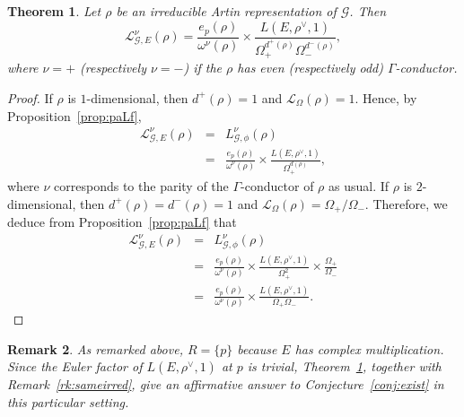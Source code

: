\documentclass{amsart}
\newtheorem{theorem}{Theorem}[section]
\newtheorem{remark}[theorem]{Remark}
\begin{document}
\begin{theorem}\label{thm:exist}
Let $\rho$ be an irreducible Artin representation of ${\mathcal{G}}$. Then
\[
{\mathcal{L}}_{{\mathcal{G}},E}^\nu(\rho)=\frac{e_p(\rho)}{\omega^\nu(\rho)}\times\frac{L(E,\rho^\vee,1)}{\Omega_+^{d^+(\rho)}\Omega_-^{d^-(\rho)}},
\]
where $\nu=+$ (respectively $\nu=-$) if the $\rho$ has even (respectively odd) $\Gamma$-conductor.
\end{theorem}
\begin{proof}
If $\rho$ is $1$-dimensional, then $d^+(\rho)=1$ and ${\mathcal{L}}_\Omega(\rho)=1$. Hence, by Proposition~\ref{prop:paLf},
\begin{eqnarray*}
{\mathcal{L}}_{{\mathcal{G}},E}^\nu(\rho)&=&L_{{\mathcal{G}},\phi}^\nu(\rho)\\
&=&\frac{e_p(\rho)}{\omega^\nu(\rho)}\times\frac{L(E,\rho^\vee,1)}{\Omega_+^{d(\rho)}},
\end{eqnarray*}
where $\nu$ corresponds to the parity of the $\Gamma$-conductor of $\rho$ as usual. If $\rho$ is $2$-dimensional, then $d^+(\rho)=d^-(\rho)=1$ and ${\mathcal{L}}_\Omega(\rho)=\Omega_+/\Omega_-$. Therefore, we deduce from Proposition~\ref{prop:paLf} that
\begin{eqnarray*}
{\mathcal{L}}_{{\mathcal{G}},E}^\nu(\rho)&=&L_{{\mathcal{G}},\phi}^\nu(\rho)\\
&=&\frac{e_p(\rho)}{\omega^\nu(\rho)}\times\frac{L(E,\rho^\vee,1)}{\Omega_+^{2}}\times\frac{\Omega_+}{\Omega_-}\\
&=&\frac{e_p(\rho)}{\omega^\nu(\rho)}\times\frac{L(E,\rho^\vee,1)}{\Omega_+\Omega_-}.
\end{eqnarray*}
\end{proof}

\begin{remark}
As remarked above, $R=\{p\}$ because $E$ has complex multiplication. Since the Euler factor of $L(E,\rho^\vee,1)$ at $p$ is trivial, Theorem~\ref{thm:exist}, together with Remark~\ref{rk:sameirred}, give an affirmative answer to Conjecture~\ref{conj:exist} in this particular setting.
\end{remark}
\end{document}
